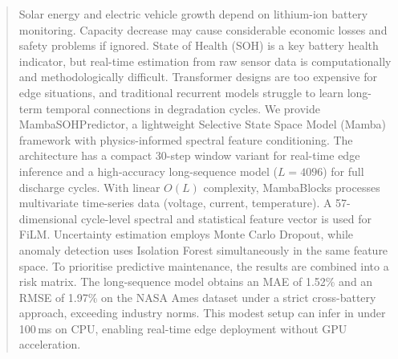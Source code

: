 
\begin{abstract}
Solar energy and electric vehicle growth depend on lithium-ion battery
monitoring. Capacity decrease may cause considerable economic losses and
safety problems if ignored. State of Health (SOH) is a key battery health
indicator, but real-time estimation from raw sensor data is computationally
and methodologically difficult. Transformer designs are too expensive for
edge situations, and traditional recurrent models struggle to learn
long-term temporal connections in degradation cycles. We provide
MambaSOHPredictor, a lightweight Selective State Space Model (Mamba)
framework with physics-informed spectral feature conditioning. The
architecture has a compact 30-step window variant for real-time edge
inference and a high-accuracy long-sequence model ($L = 4096$) for full
discharge cycles. With linear $O(L)$ complexity, MambaBlocks processes
multivariate time-series data (voltage, current, temperature). A
57-dimensional cycle-level spectral and statistical feature vector is used
for FiLM. Uncertainty estimation employs Monte Carlo Dropout, while anomaly
detection uses Isolation Forest simultaneously in the same feature space. To
prioritise predictive maintenance, the results are combined into a risk
matrix. The long-sequence model obtains an MAE of 1.52\% and an RMSE of
1.97\% on the NASA Ames dataset under a strict cross-battery approach, exceeding
industry norms. This modest setup can infer in under 100\,ms on CPU,
enabling real-time edge deployment without GPU acceleration.

\end{abstract}
